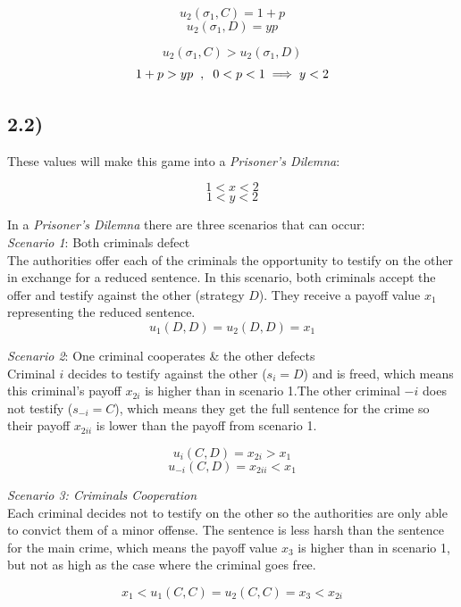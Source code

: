 \documentclass[a4paper,11pt]{article}
\begin{document}
\[ u_2(\sigma_1, C) =  1 + p \]
\[ u_2(\sigma_1, D) = yp \]

\[ u_2(\sigma_1, C) > u_2(\sigma_1, D) \]
\[ 1 + p > yp \hspace{2mm},\hspace{2mm} 0 < p < 1 \implies y < 2 \]



\subsection*{2.2)}

These values will make this game into a \textit{Prisoner's Dilemna}:

\[ 1 < x < 2 \]
\[ 1 < y < 2 \]

In a \textit{Prisoner's Dilemna} there are three scenarios that can occur:\\

\textit{Scenario 1}: Both criminals defect\\

The authorities offer each of the criminals the opportunity to testify on the other in exchange for a reduced sentence.
In this scenario, both criminals accept the offer and testify against the other (strategy $D$).
They receive a payoff value $x_1$ representing the reduced sentence.
\[ u_1(D,D) = u_2(D, D) = x_1 \]

\textit{Scenario 2}: One criminal cooperates \& the other defects\\

Criminal $i$ decides to testify against the other ($s_i = D$) and is freed, which means this criminal's payoff $x_{2i}$ is higher
than in scenario 1.The other criminal $-i$ does not testify ($s_{-i} = C$), which means they get the full sentence 
for the crime so their payoff $x_{2ii}$ is lower than the payoff from scenario 1.

\[ u_i(C,D) = x_{2i} > x_1 \]
\[ u_{-i}(C,D) = x_{2ii} < x_1 \]

\vspace{12px}
\textit{Scenario 3: Criminals Cooperation}\\

Each criminal decides not to testify on the other so the authorities are only able to convict them of a minor
offense. The sentence is less harsh than the sentence for the main crime, which means the payoff value $x_3$ is higher
than in scenario 1, but not as high as the case where the criminal goes free.

\[ x_1 < u_1(C,C) = u_2(C, C) = x_3 < x_{2i} \]
\end{document}
